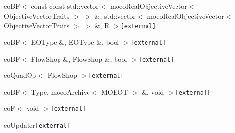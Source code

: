\begin{CompactList}
\begin{CompactList}
\begin{CompactList}
\end{CompactList}
\item eo\-BF$<$ const const std::vector$<$ moeo\-Real\-Objective\-Vector$<$ Objective\-Vector\-Traits $>$ $>$ \&, std::vector$<$ moeo\-Real\-Objective\-Vector$<$ Objective\-Vector\-Traits $>$ $>$ \&, R $>${\tt  [external]}\begin{CompactList}
\item {}
\end{CompactList}
\item eo\-BF$<$ EOType \&, EOType \&, bool $>${\tt  [external]}\item eo\-BF$<$ Flow\-Shop \&, Flow\-Shop \&, bool $>${\tt  [external]}\begin{CompactList}
\item eo\-Quad\-Op$<$ Flow\-Shop $>${\tt  [external]}\begin{CompactList}
\item {}
\end{CompactList}
\end{CompactList}
\item eo\-BF$<$ Type, moeo\-Archive$<$ MOEOT $>$ \&, void $>${\tt  [external]}\begin{CompactList}
\item {}
\begin{CompactList}
\item {}
\end{CompactList}
\end{CompactList}
\item eo\-F$<$ void $>${\tt  [external]}\begin{CompactList}
\item eo\-Updater{\tt  [external]}\begin{CompactList}
\item {}
\item {}

\end{CompactList}
\end{CompactList}
\end{CompactList}
\end{CompactList}
